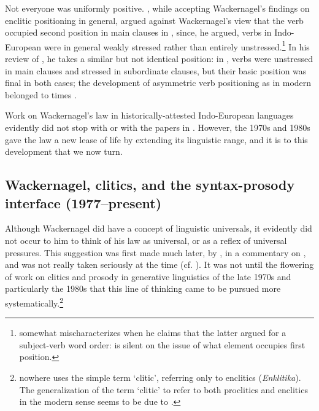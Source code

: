 Not everyone was uniformly positive. \citet[81--83]{Delbrueck1900}, while accepting Wackernagel's findings on enclitic positioning in general, argued against Wackernagel's view that the verb occupied second position in main clauses in , since, he argued, verbs in Indo-European were in general weakly stressed rather than entirely unstressed.\footnote{\citet[81]{Delbrueck1900} somewhat mischaracterizes \citet{Wackernagel1892} when he claims that the latter argued for a subject-verb word order: \citet{Wackernagel1892} is silent on the issue of what element occupies first position.} In his review of \citet{Ries1907}, he takes a similar but not identical position: in , verbs were unstressed in main clauses and stressed in subordinate clauses, but their basic position was final in both cases; the development of asymmetric verb positioning as in modern  belonged to  times \citep[75--76]{Delbrueck1907}.

Work on Wackernagel's law in historically-attested Indo-European languages evidently did not stop with \citet{Watkins1964} or with the papers in \citet{EichnerRix1990}. However, the 1970s and 1980s gave the law a new lease of life by extending its linguistic range, and it is to this development that we now turn.

\subsection{Wackernagel, clitics, and the syntax-prosody interface (1977--present)}

Although Wackernagel did have a concept of linguistic universals, it evidently did not occur to him to think of his law as universal, or as a reflex of universal pressures. This suggestion was first made much later, by \citet[613]{Kurylowicz1958}, in a commentary on \citet{Ivanov1958}, and was not really taken seriously at the time (cf. \citealp[1036]{Watkins1964}). It was not until the flowering of work on clitics and prosody in generative linguistics of the late 1970s and particularly the 1980s that this line of thinking came to be pursued more systematically.\footnote{\citet{Wackernagel1892} nowhere uses the simple term `clitic', referring only to enclitics (\textit{Enklitika}). The generalization of the term `clitic' to refer to both proclitics and enclitics in the modern sense seems to be due to \citet[155]{Nida1946} \citep{Haspelmath2015}.}

